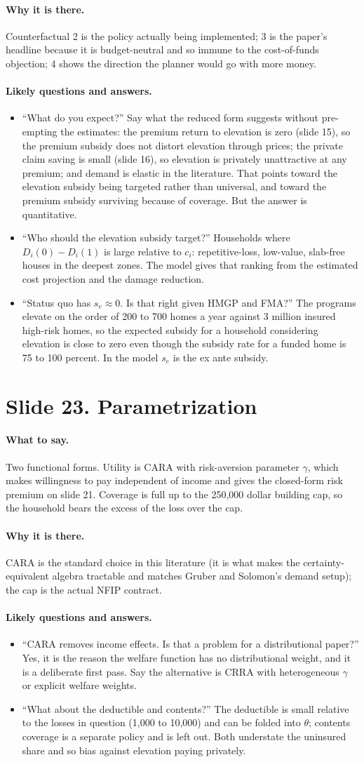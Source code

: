 \documentclass[11pt]{article}
\newcommand{\slide}[2]{\section*{Slide #1. #2}\addcontentsline{toc}{section}{Slide #1. #2}}
\newcommand{\say}{\paragraph{What to say.}}
\newcommand{\why}{\paragraph{Why it is there.}}
\newcommand{\qa}{\paragraph{Likely questions and answers.}}
\begin{document}
\why Counterfactual 2 is the policy actually being implemented; 3 is the paper's headline because it is budget-neutral and so immune to the cost-of-funds objection; 4 shows the direction the planner would go with more money.

\qa
\begin{itemize}
\item ``What do you expect?'' Say what the reduced form suggests without pre-empting the estimates: the premium return to elevation is zero (slide 15), so the premium subsidy does not distort elevation through prices; the private claim saving is small (slide 16), so elevation is privately unattractive at any premium; and demand is elastic in the literature. That points toward the elevation subsidy being targeted rather than universal, and toward the premium subsidy surviving because of coverage. But the answer is quantitative.
\item ``Who should the elevation subsidy target?'' Households where $D_i(0)-D_i(1)$ is large relative to $c_i$: repetitive-loss, low-value, slab-free houses in the deepest zones. The model gives that ranking from the estimated cost projection and the damage reduction.
\item ``Status quo has $s_e \approx 0$. Is that right given HMGP and FMA?'' The programs elevate on the order of 200 to 700 homes a year against 3 million insured high-risk homes, so the expected subsidy for a household considering elevation is close to zero even though the subsidy rate for a funded home is 75 to 100 percent. In the model $s_e$ is the ex ante subsidy.
\end{itemize}

\slide{23}{Parametrization}
\say Two functional forms. Utility is CARA with risk-aversion parameter $\gamma$, which makes willingness to pay independent of income and gives the closed-form risk premium on slide 21. Coverage is full up to the 250,000 dollar building cap, so the household bears the excess of the loss over the cap.

\why CARA is the standard choice in this literature (it is what makes the certainty-equivalent algebra tractable and matches Gruber and Solomon's demand setup); the cap is the actual NFIP contract.

\qa
\begin{itemize}
\item ``CARA removes income effects. Is that a problem for a distributional paper?'' Yes, it is the reason the welfare function has no distributional weight, and it is a deliberate first pass. Say the alternative is CRRA with heterogeneous $\gamma$ or explicit welfare weights.
\item ``What about the deductible and contents?'' The deductible is small relative to the losses in question (1,000 to 10,000) and can be folded into $\theta$; contents coverage is a separate policy and is left out. Both understate the uninsured share and so bias against elevation paying privately.
\end{itemize}
\end{document}
